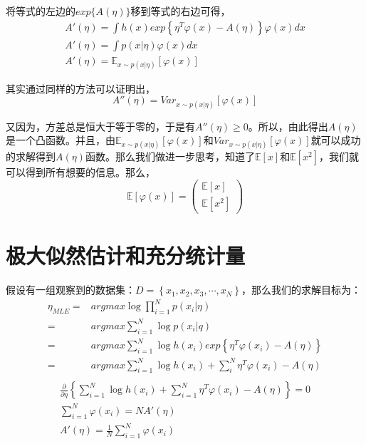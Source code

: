 \documentclass[a4paper]{article}
\begin{document}
将等式的左边的$exp \{A(\eta)\} $移到等式的右边可得，
\begin{gather}
    A'(\eta) = \int h(x)exp\left\{ \eta^T\varphi(x) - A(\eta)\right\}\varphi(x) dx \\
    A'(\eta) = \int p(x|\eta)\varphi(x)dx \\
    A'(\eta) = \mathbb{E}_{x \sim p(x|\eta)}[\varphi(x)]
\end{gather}

其实通过同样的方法可以证明出，
\begin{equation}
    A''(\eta) = Var_{x \sim p(x|\eta)}[\varphi(x)]
\end{equation}

又因为，方差总是恒大于等于零的，于是有$A''(\eta)\geq 0$。所以，由此得出$A(\eta)$是一个凸函数。并且，由$\mathbb{E}_{x \sim p(x|\eta)}[\varphi(x)]$和$Var_{x \sim p(x|\eta)}[\varphi(x)]$就可以成功的求解得到$A(\eta)$函数。那么我们做进一步思考，知道了$\mathbb{E}[x]$和$\mathbb{E}[x^2]$，我们就可以得到所有想要的信息。那么，
\begin{equation}
    \mathbb{E}[\varphi(x)]
    =
    \begin{pmatrix}
        \mathbb{E}[x] \\
        \mathbb{E}[x^2]
    \end{pmatrix}
\end{equation}

\section{极大似然估计和充分统计量}
假设有一组观察到的数据集：$D=\left\{ x_1, x_2, x_3, \cdots, x_N \right\}$，那么我们的求解目标为：
\begin{equation}
    \begin{split}
        \eta_{MLE} = & argmax \log \prod_{i=1}^N p(x_i|\eta) \\
        = & argmax \sum_{i=1}^N\log p(x_i|q) \\
        = & argmax \sum_{i=1}^N\log h(x_i) exp \left\{ \eta^T\varphi(x_i) - A(\eta) \right\} \\
        = & argmax \sum_{i=1}^N\log h(x_i) + \sum_{i}^N\eta^T\varphi(x_i) - A(\eta) \\
    \end{split}
\end{equation}
\begin{gather}
    \frac{\partial}{\partial \eta} \left\{ \sum_{i=1}^N\log h(x_i) + \sum_{i=1}^N\eta^T\varphi(x_i) - A(\eta) \right\} = 0 \\
    \sum_{i=1}^N\varphi(x_i) = N A'(\eta) \\ 
    A'(\eta) = \frac{1}{N}\sum_{i=1}^N\varphi(x_i)
\end{gather}
\end{document}
